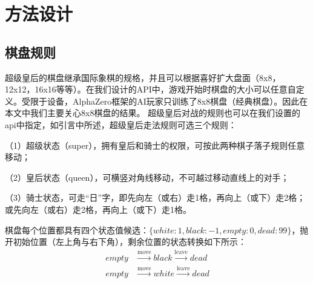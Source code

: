 \chapter{方法设计}
\label{chap:algorithm}

\section{棋盘规则}
超级皇后的棋盘继承国际象棋的规格，并且可以根据喜好扩大盘面（8x8，12x12，16x16等等）。在我们设计的API中，游戏开始时棋盘的大小可以任意自定义。受限于设备，AlphaZero框架的AI玩家只训练了8x8棋盘（经典棋盘）。因此在本文中我们主要关心8x8棋盘的结果。
超级皇后对战的规则也可以在我们设置的api中指定，如引言中所述，超级皇后走法规则可选三个规则：

（1）超级状态（super），拥有皇后和骑士的权限，可按此两种棋子落子规则任意移动；

（2）皇后状态（queen），可横竖对角线移动，不可越过移动直线上的对手；

（3）骑士状态，可走“日”字，即先向左（或右）走1格，再向上（或下）走2格；或先向左（或右）走2格，再向上（或下）走1格。

棋盘每个位置都具有四个状态值候选：$\{white:1, black:-1,empty:0,dead:99\}$，抛开初始位置（左上角与右下角），剩余位置的状态转换如下所示：
\begin{equation}
    \begin{aligned}
    empty &\stackrel{\mathrm{move}}{\longrightarrow} black \stackrel{\mathrm{leave}}{\longrightarrow} dead \\
    empty &\stackrel{\mathrm{move}}{\longrightarrow} white \stackrel{\mathrm{leave}}{\longrightarrow} dead 
    \end{aligned}
\end{equation}

